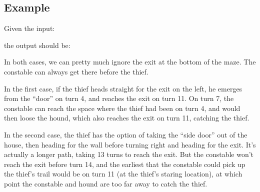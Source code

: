 \subsection*{Example}

Given the input:

\clearpage
{}


the output should be:


In both cases, we can pretty much ignore the exit at the bottom of the
maze. The constable can always get there before the thief.

In the first case, if the thief heads straight for the exit on the
left, he emerges from the ``door'' on turn 4, and reaches the exit on
turn 11. On turn 7, the constable can reach the space where the thief
had been on turn 4, and would then loose the hound, which also reaches
the exit on turn 11, catching the thief.

In the second case, the thief has the option of taking the ``side
door'' out of the house, then heading for the wall before turning
right and heading for the exit. It's actually a longer path, taking 13
turns to reach the exit. But the constable won't reach the exit before
turn 14, and the earliest that the constable could
pick up the thief's trail would be on turn 11 (at the thief's staring
location), at which point the constable and hound are too far away to
catch the thief.
